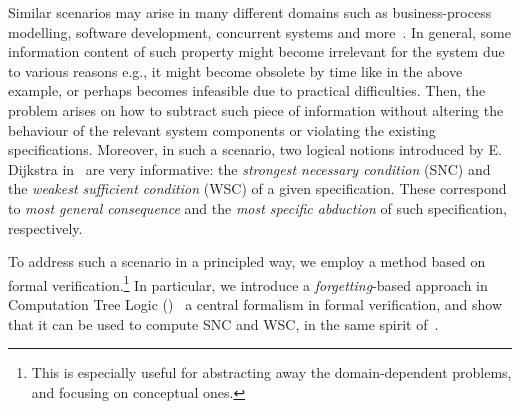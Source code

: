 \documentclass{article}
\begin{document}
Similar scenarios may arise in many different domains such as business-process modelling, software development, concurrent systems and more~\cite{Baier:PMC:2008}.  In general,  some information content of such property might become irrelevant for the system due to various reasons e.g., it might become obsolete by time like in the above example, or perhaps  becomes infeasible due to practical difficulties. Then, the problem arises on how to subtract such piece of information without altering the behaviour of the relevant system components or violating the existing specifications. Moreover, in such a scenario, two logical notions introduced by E. Dijkstra in~\cite{dijkstra1978guarded} are very informative: the \emph{strongest necessary condition} (SNC) and the \emph{weakest sufficient condition}  (WSC)  of a given specification. These correspond to \emph{most general consequence} and the \emph{most specific abduction} of such specification, respectively.






To address such a scenario in a principled way, we employ a  method based on formal verification.\footnote{ This is  especially useful for abstracting away the domain-dependent problems, and focusing on conceptual ones.} In particular, 
we introduce a \emph{forgetting}-based approach in Computation Tree Logic (\CTL)~\cite{clarke1981design}  
a central formalism in formal verification, and show that it can
be used to compute SNC and WSC, in the same spirit of~\cite{DBLP:journals/ai/Lin01}.
\end{document}
